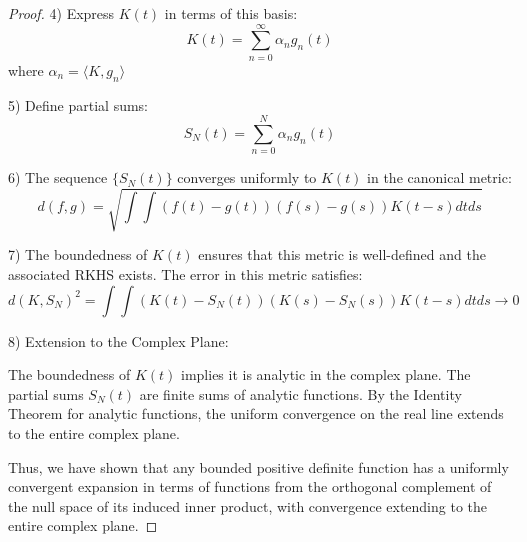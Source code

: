\documentclass{article}
\begin{document}
\begin{proof}
  4) Express $K(t)$ in terms of this basis:
  \begin{equation}
    K(t) = \sum_{n=0}^{\infty} \alpha_n g_n(t)
  \end{equation}
  where $\alpha_n = \langle K, g_n \rangle$

  5) Define partial sums:
  \begin{equation}
    S_N(t) = \sum_{n=0}^N \alpha_n g_n(t)
  \end{equation}

  6) The sequence $\{S_N(t)\}$ converges uniformly to $K(t)$ in the canonical 
  metric:
  \begin{equation}
    d(f,g) = \sqrt{\int\int (f(t)-g(t))(f(s)-g(s))K(t-s)dtds}
  \end{equation}

  7) The boundedness of $K(t)$ ensures that this metric is well-defined and 
  the associated RKHS exists. The error in this metric satisfies:
  \begin{equation}
    d(K,S_N)^2 = \int\int (K(t)-S_N(t))(K(s)-S_N(s))K(t-s)dtds \to 0
  \end{equation}

  8) Extension to the Complex Plane:
  
  The boundedness of $K(t)$ implies it is analytic in the complex plane. The 
  partial sums $S_N(t)$ are finite sums of analytic functions. By the Identity 
  Theorem for analytic functions, the uniform convergence on the real line extends 
  to the entire complex plane.

  Thus, we have shown that any bounded positive definite function has a uniformly 
  convergent expansion in terms of functions from the orthogonal complement of 
  the null space of its induced inner product, with convergence extending to 
  the entire complex plane.
\end{proof}
\end{document}
